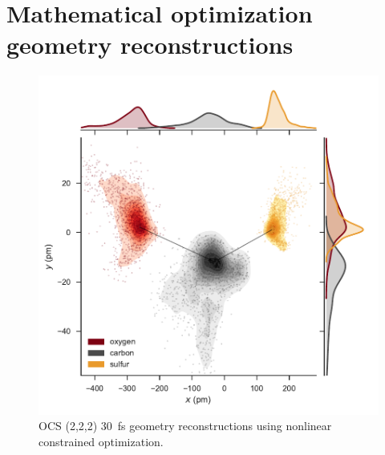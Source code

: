 \section{Mathematical optimization geometry reconstructions}

\begin{figure}[H]
  \centering
  \includegraphics[width=\textwidth]{Plots/OCS22230fsMOGeometry}
  \caption[OCS (2,2,2) \SI{30}{\fs} geometry reconstructions using nonlinear constrained optimization.]
  {OCS (2,2,2) \SI{30}{\fs} geometry reconstructions using nonlinear constrained optimization.}
  \label{fig:OCS22230fsMOGeometry}
\end{figure}


